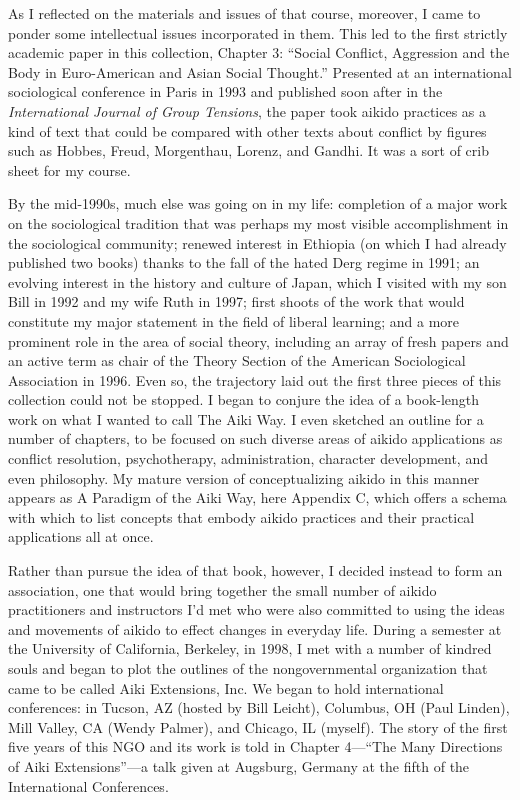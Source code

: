 As I reflected on the materials and issues of that course, moreover, I came to ponder some intellectual issues incorporated in them. This led to the first strictly academic paper in this collection, Chapter 3: ``Social Conflict, Aggression and the Body in Euro-American and Asian Social Thought.'' Presented at an international sociological conference in Paris in 1993 and published soon after in the \emph{International Journal of Group Tensions}, the paper took aikido practices as a kind of text that could be compared with other texts about conflict by figures such as Hobbes, Freud, Morgenthau, Lorenz, and Gandhi. It was a sort of crib sheet for my course.

By the mid-1990s, much else was going on in my life: completion of a major work on the sociological tradition that was perhaps my most visible accomplishment in the sociological community; renewed interest in Ethiopia (on which I had already published two books) thanks to the fall of the hated Derg regime in 1991; an evolving interest in the history and culture of Japan, which I visited with my son Bill in 1992 and my wife Ruth in 1997; first shoots of the work that would constitute my major statement in the field of liberal learning; and a more prominent role in the area of social theory, including an array of fresh papers and an active term as chair of the Theory Section of the American Sociological Association in 1996. Even so, the trajectory laid out the first three pieces of this collection could not be stopped. I began to conjure the idea of a book-length work on what I wanted to call The Aiki Way. I even sketched an outline for a number of chapters, to be focused on such diverse areas of aikido applications as conflict resolution, psychotherapy, administration, character development, and even philosophy. My mature version of conceptualizing aikido in this manner appears as A Paradigm of the Aiki Way, here Appendix C, which offers a schema with which to list concepts that embody aikido practices and their practical applications all at once. 

Rather than pursue the idea of that book, however, I decided instead to form an association, one that would bring together the small number of aikido practitioners and instructors I'd met who were also committed to using the ideas and movements of aikido to effect changes in everyday life. During a semester at the University of California, Berkeley, in 1998, I met with a number of kindred souls and began to plot the outlines of the nongovernmental organization that came to be called Aiki Extensions, Inc. We began to hold international conferences: in Tucson, AZ (hosted by Bill Leicht), Columbus, OH (Paul Linden), Mill Valley, CA (Wendy Palmer), and Chicago, IL (myself). The story of the first five years of this NGO and its work is told in Chapter 4---``The Many Directions of Aiki Extensions''---a talk given at Augsburg, Germany at the fifth of the International Conferences. 

